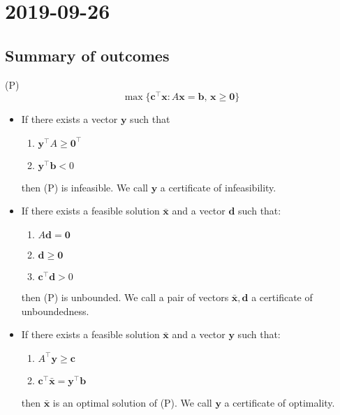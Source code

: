 \section{2019-09-26}
\subsection{Summary of outcomes}
(P)
\[\max \{\bm{c}^\top \bm{x} : A\bm{x}=\bm{b},\,
\bm{x}\ge\bm{0}\}\]
\begin{itemize}
    \item If there exists a vector $ \bm{y} $ such that
    \begin{enumerate}[(1)]
        \item $\bm{y}^\top A\ge\bm{0}^\top $
        \item $\bm{y}^\top \bm{b}<0$
    \end{enumerate}
    then (P) is infeasible. We call $ \bm{y} $ a certificate of infeasibility.

    \item If there exists a feasible solution $\bar{\bm{x}}$ and a vector $ \bm{d} $ such that:
    \begin{enumerate}[(1)]
        \item $A\bm{d}=\bm{0}$
        \item $\bm{d}\ge \bm{0}$
        \item $\bm{c}^\top \bm{d}>0$
    \end{enumerate}
    then (P) is unbounded. We call a pair of vectors $ \bar{\bm{x}}, \bm{d} $
    a certificate of unboundedness.

    \item If there exists a feasible solution $ \bm{\bar{x}} $ and a vector $ \bm{y} $ such that:
    \begin{enumerate}[(1)]
        \item $A^\top \bm{y}\ge\bm{c}$
        \item $\bm{c}^\top \bm{\bar{x}}=\bm{y}^\top \bm{b}$
    \end{enumerate}
    then $\bm{\bar{x}}$ is an optimal solution of (P). We call $ \bm{y} $
    a certificate of optimality.
\end{itemize}

